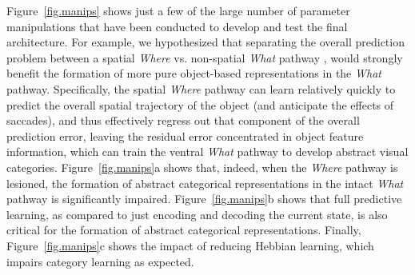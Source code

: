 \documentclass[12pt,twoside]{article}
\newif\myifpdf
\begin{document}
Figure~\ref{fig.manips} shows just a few of the large number of parameter manipulations that have been conducted to develop and test the final architecture.  For example, we hypothesized that separating the overall prediction problem between a spatial {\em Where} vs. non-spatial {\em What} pathway \cite{UngerleiderMishkin82,GoodaleMilner92}, would strongly benefit the formation of more pure object-based representations
in the {\em What} pathway.  Specifically, the spatial {\em Where} pathway can learn relatively quickly to predict the overall spatial trajectory of the object (and anticipate the effects of saccades), and thus effectively regress out that component of the overall prediction error, leaving the residual error concentrated in object feature information, which can train the ventral {\em What} pathway to develop abstract visual categories.  Figure~\ref{fig.manips}a shows that, indeed, when the {\em Where} pathway is lesioned, the formation of abstract categorical representations in the intact {\em What} pathway is significantly impaired.  Figure~\ref{fig.manips}b shows that full predictive learning, as compared to just encoding and decoding the current state, is also critical for the formation of abstract categorical representations.  Finally, Figure~\ref{fig.manips}c shows the impact of reducing Hebbian learning, which impairs category learning as expected.
\end{document}
